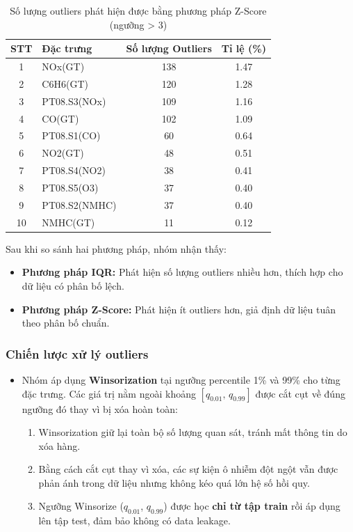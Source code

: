 \documentclass[12pt,a4paper]{report}
\newcommand{\theadcolor}{\rowcolor{tableheader}}
\begin{document}
\begin{center}
\begin{table}[H]
\centering
\caption{Số lượng outliers phát hiện được bằng phương pháp Z-Score (ngưỡng > 3)}
\label{table:outliers_zscore}
\begin{tabular}{|c|l|c|c|}
\hline
\theadcolor \textbf{STT} & \textbf{Đặc trưng} & \textbf{Số lượng Outliers} & \textbf{Tỉ lệ (\%)} \\
\hline
1 & NOx(GT) & 138 & 1.47 \\
\hline
2 & C6H6(GT) & 120 & 1.28 \\
\hline
3 & PT08.S3(NOx) & 109 & 1.16 \\
\hline
4 & CO(GT) & 102 & 1.09 \\
\hline
5 & PT08.S1(CO) & 60 & 0.64 \\
\hline
6 & NO2(GT) & 48 & 0.51 \\
\hline
7 & PT08.S4(NO2) & 38 & 0.41 \\
\hline
8 & PT08.S5(O3) & 37 & 0.40 \\
\hline
9 & PT08.S2(NMHC) & 37 & 0.40 \\
\hline
10 & NMHC(GT) & 11 & 0.12 \\
\hline
\end{tabular}
\end{table}
\end{center}
 
Sau khi so sánh hai phương pháp, nhóm nhận thấy:
 
\begin{itemize}
    \item \textbf{Phương pháp IQR:} Phát hiện số lượng outliers nhiều hơn, thích hợp cho dữ liệu có phân bố lệch.
    \item \textbf{Phương pháp Z-Score:} Phát hiện ít outliers hơn, giả định dữ liệu tuân theo phân bố chuẩn.
\end{itemize}
\subsubsection{Chiến lược xử lý outliers}

\begin{itemize}
    \item Nhóm áp dụng \textbf{Winsorization} tại ngưỡng percentile 1\% và 99\% cho từng đặc trưng. Các giá trị nằm ngoài khoảng $[q_{0.01},\, q_{0.99}]$ được cắt cụt về đúng ngưỡng đó thay vì bị xóa hoàn toàn:
    \begin{enumerate}
        \item Winsorization giữ lại toàn bộ số lượng quan sát, tránh mất thông tin do xóa hàng.
        \item Bằng cách cắt cụt thay vì xóa, các sự kiện ô nhiễm đột ngột vẫn được phản ánh trong dữ liệu nhưng không kéo quá lớn hệ số hồi quy.
        \item Ngưỡng Winsorize ($q_{0.01}$, $q_{0.99}$) được học \textbf{chỉ từ tập train} rồi áp dụng lên tập test, đảm bảo không có data leakage.
    \end{enumerate}
\end{itemize}
\end{document}
